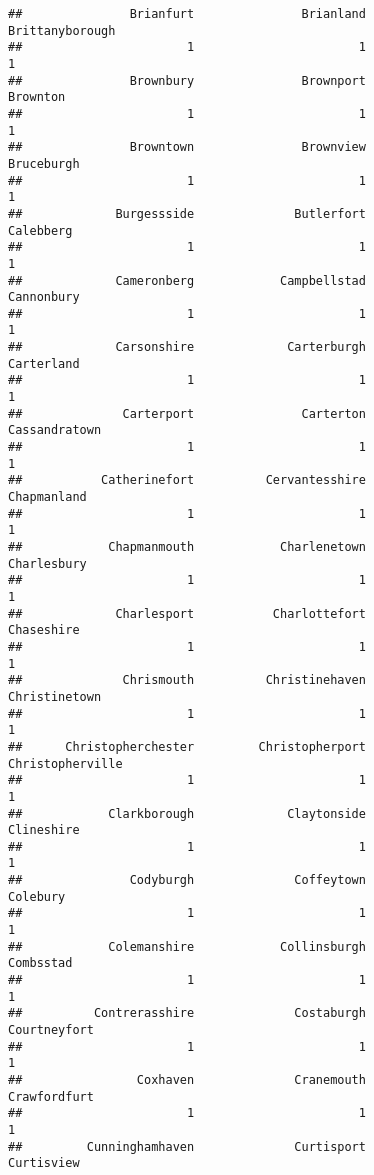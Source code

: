 \documentclass[
]{article}
\begin{document}
\begin{verbatim}
##               Brianfurt               Brianland         Brittanyborough 
##                       1                       1                       1 
##               Brownbury               Brownport                Brownton 
##                       1                       1                       1 
##               Browntown               Brownview              Bruceburgh 
##                       1                       1                       1 
##             Burgessside              Butlerfort               Calebberg 
##                       1                       1                       1 
##             Cameronberg            Campbellstad              Cannonbury 
##                       1                       1                       1 
##             Carsonshire             Carterburgh              Carterland 
##                       1                       1                       1 
##              Carterport               Carterton           Cassandratown 
##                       1                       1                       1 
##           Catherinefort          Cervantesshire             Chapmanland 
##                       1                       1                       1 
##            Chapmanmouth            Charlenetown             Charlesbury 
##                       1                       1                       1 
##             Charlesport           Charlottefort              Chaseshire 
##                       1                       1                       1 
##              Chrismouth          Christinehaven           Christinetown 
##                       1                       1                       1 
##      Christopherchester         Christopherport        Christopherville 
##                       1                       1                       1 
##            Clarkborough             Claytonside              Clineshire 
##                       1                       1                       1 
##               Codyburgh              Coffeytown                Colebury 
##                       1                       1                       1 
##            Colemanshire            Collinsburgh               Combsstad 
##                       1                       1                       1 
##          Contrerasshire              Costaburgh            Courtneyfort 
##                       1                       1                       1 
##                Coxhaven              Cranemouth            Crawfordfurt 
##                       1                       1                       1 
##         Cunninghamhaven              Curtisport              Curtisview 

\end{verbatim}
\end{document}
